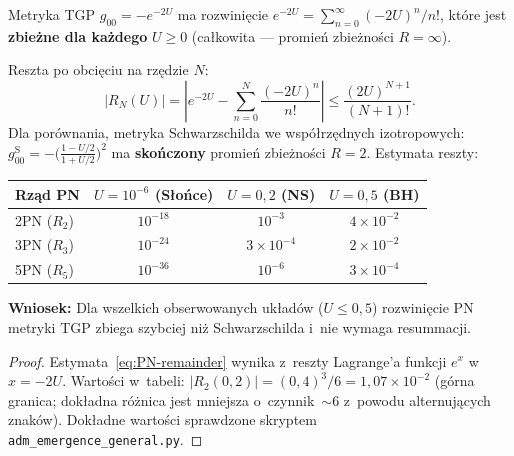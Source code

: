 \begin{proposition}%
\label{prop:PN-convergence}
Metryka TGP $g_{00} = -e^{-2U}$ ma rozwini\k{e}cie
$e^{-2U} = \sum_{n=0}^\infty (-2U)^n/n!$, kt\'ore jest
\textbf{zbie\.zne dla ka\.zdego} $U \geq 0$ (ca\l{}kowita
--- promie\'n zbie\.zno\'sci $R = \infty$).

Reszta po obci\k{e}ciu na rz\k{e}dzie $N$:
\begin{equation}\label{eq:PN-remainder}
  \bigl|R_N(U)\bigr| =
  \left|e^{-2U} - \sum_{n=0}^{N}\frac{(-2U)^n}{n!}\right|
  \leq \frac{(2U)^{N+1}}{(N+1)!}.
\end{equation}
Dla por\'ownania, metryka Schwarzschilda we wsp\'o\l{}rz\k{e}dnych
izotropowych:
$g_{00}^{\mathrm{S}} = -\bigl(\frac{1-U/2}{1+U/2}\bigr)^2$
ma \textbf{sko\'nczony} promie\'n zbie\.zno\'sci $R = 2$.
Estymata reszty:
\begin{center}
\begin{tabular}{lccc}
\toprule
Rz\k{a}d PN & $U = 10^{-6}$ (S\l{}o\'nce) & $U = 0{,}2$ (NS) & $U = 0{,}5$ (BH) \\
\midrule
2PN ($R_2$) & $10^{-18}$ & $10^{-3}$ & $4 \times 10^{-2}$ \\
3PN ($R_3$) & $10^{-24}$ & $3 \times 10^{-4}$ & $2 \times 10^{-2}$ \\
5PN ($R_5$) & $10^{-36}$ & $10^{-6}$ & $3 \times 10^{-4}$ \\
\bottomrule
\end{tabular}
\end{center}
\textbf{Wniosek:} Dla wszelkich obserwowanych uk\l{}ad\'ow
($U \leq 0{,}5$) rozwini\k{e}cie PN metryki TGP zbiega
szybciej ni\.z Schwarzschilda i~nie wymaga resummacji.
\end{proposition}

\begin{proof}
Estymata~\eqref{eq:PN-remainder} wynika z~reszty Lagrange'a
funkcji $e^x$ w~$x = -2U$.
Warto\'sci w~tabeli:
$|R_2(0{,}2)| = (0{,}4)^3/6 = 1{,}07 \times 10^{-2}$
(g\'orna granica; dok\l{}adna r\'o\.znica jest mniejsza
o~czynnik~$\sim 6$ z~powodu alternuj\k{a}cych znak\'ow).
Dok\l{}adne warto\'sci sprawdzone
skryptem \texttt{adm\_emergence\_general.py}.
\end{proof}

